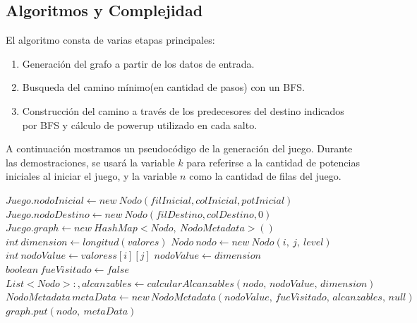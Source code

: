 \subsection{Algoritmos y Complejidad} \label{ej_3:algoritmo}
El algoritmo consta de varias etapas principales:
\begin{enumerate}
	\item Generaci\'on del grafo a partir de los datos de entrada.
	\item Busqueda del camino m\'inimo(en cantidad de pasos) con un BFS.
	\item Construcci\'on del camino a trav\'es de los predecesores del destino indicados por BFS y
 			c\'alculo de powerup utilizado en cada salto.
 \end{enumerate}

A continuaci\'on mostramos un pseudoc\'odigo de la generaci\'on del juego. Durante las demostraciones, se usar\'a la variable $k$ para referirse a la cantidad de potencias iniciales al iniciar el juego, y la variable $n$ como la cantidad de filas del juego.
\vspace{2mm}
\begin{algorithmic}[1]
\Statex
	\State $Juego.nodoInicial \gets new \: Nodo(filInicial, colInicial, potInicial)$
	\State $Juego.nodoDestino \gets new \: Nodo(filDestino, colDestino, 0) $
	\State $Juego.graph \gets new \: HashMap<Nodo,\: NodoMetadata>()$
	\State $int \: dimension \gets longitud(valores)$
				\State	$Nodo \: nodo\gets new \: Nodo(i,\: j,\: level)$
				\State	$int\: nodoValue \gets valoress[i][j]$
					\State $nodoValue \gets dimension$
				\EndIf
				\State	$boolean \:fueVisitado \gets false$
				\State	$List<Nodo>:, alcanzables \gets calcularAlcanzables(nodo,\, nodoValue,\, dimension)$
				\State	$NodoMetadata \, metaData \gets new\, NodoMetadata(nodoValue,\, fueVisitado,\, alcanzables,\, null)$
				\State	$graph.put(nodo,\: metaData)$
			\EndFor
		\EndFor
	\EndFor

\EndProcedure
\Statex
\end{algorithmic}
\vspace{2mm}

